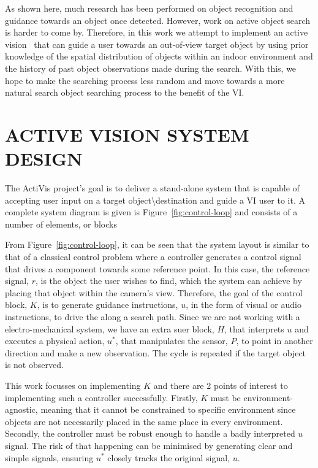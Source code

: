 \documentclass[a4paper, twoside]{article}
\begin{document}
As shown here, much research has been performed on object recognition and guidance towards an object once detected. However, work on active object search is harder to come by. Therefore, in this work we attempt to implement an active vision~\cite{aloimonos1988active,bellotto2013,lock2017portable} that can guide a user towards an out-of-view target object by using prior knowledge of the spatial distribution of objects within an indoor environment and the history of past object observations made during the search. With this, we hope to make the searching process less random and move towards a more natural search object searching process to the benefit of the VI\@.  

\section{\uppercase{Active Vision System Design}}\label{sec:system-design}

\noindent The ActiVis project's goal is to deliver a stand-alone system that is capable of accepting user input on a target object\textbackslash{}destination and guide a VI user to it. A complete system diagram is given is Figure~\ref{fig:control-loop} and consists of a number of elements, or blocks

From Figure~\ref{fig:control-loop}, it can be seen that the system layout is similar to that of a classical control problem where a controller generates a control signal that drives a component towards some reference point. In this case, the reference signal, $r$, is the object the user wishes to find, which the system can achieve by placing that object within the camera's view. Therefore, the goal of the control block, $K$, is to generate guidance instructions, $u$, in the form of visual or audio instructions, to drive the along a search path. Since we are not working with a electro-mechanical system, we have an extra suer block, $H$, that interprets $u$ and executes a physical action, $u^*$, that manipulates the sensor, $P$, to point in another direction and make a new observation. The cycle is repeated if the target object is not observed.  

This work focusses on implementing $K$ and there are 2 points of interest to implementing such a controller successfully. Firstly, $K$ must be environment-agnostic, meaning that it cannot be constrained to specific environment since objects are not necessarily placed in the same place in every environment. Secondly, the controller must be robust enough to handle a badly interpreted $u$ signal. The risk of that happening can be minimised by generating clear and simple signals, ensuring $u^*$ closely tracks the original signal, $u$. 
\end{document}
